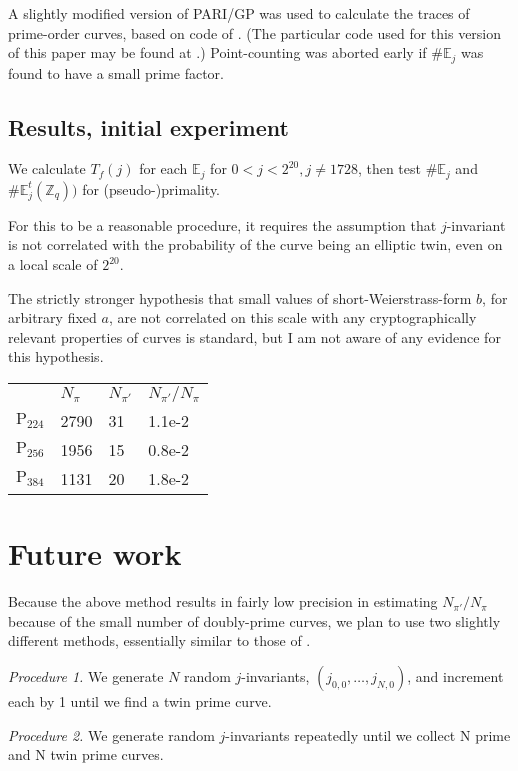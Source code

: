 \documentclass[11pt,fleqn]{article}
\newcommand{\mathup}{\mathrm}
\newcommand{\BbbZ}{\mathbb{Z}}
\newcommand{\BbbE}{\mathbb{E}}
\newcommand{\Ejt}{\ensuremath{\BbbE^t_j(\BbbZ_q))} }
\newcommand{\Tf}{\ensuremath{T_f(j)} }
\newcommand{\Pa}{\ensuremath{\mathup{P}_{224}} }
\newcommand{\Pb}{\ensuremath{\mathup{P}_{256}} }
\newcommand{\Pc}{\ensuremath{\mathup{P}_{384}} }
\newcommand{\Ej}{\ensuremath{\BbbE_j} }
\begin{document}
A slightly modified version of PARI/GP was used to calculate the
traces of prime-order curves, based on code of \autocite{HamburgPARI}.
(The particular code used for this version of this paper may be
found at \autocite{junkpari}.) Point-counting was aborted early
if $\#\Ej$ was found to have a small prime factor.

\subsection{Results, initial experiment} 

We calculate \Tf for each \Ej for $0 < j < 2^{20}, j \neq 1728$, then
test $\#\Ej$ and $\#\Ejt$ for (pseudo-)primality.

For this to be a reasonable procedure, it requires the assumption that
$j$-invariant is not correlated with the probability of the curve being
an elliptic twin, even on a local scale of $2^{20}$.

The strictly stronger hypothesis that small values of short-Weierstrass-form
$b$, for arbitrary fixed $a$, are not correlated on this scale with any
cryptographically relevant properties of curves is standard, but I am not
aware of any evidence for this hypothesis.

\begin{tabular}[l]{l|lll}
      & $N_{\pi}$ & $N_{\pi'}$ & $N_{\pi'} / N_{\pi}$ \\
  \Pa & 2790 & 31 & 1.1e-2 \\
  \Pb & 1956 & 15 & 0.8e-2 \\
  \Pc & 1131 & 20 & 1.8e-2 \\
\end{tabular}

\section{Future work}

Because the above method results in fairly low precision in estimating
$N_{\pi'} / N_{\pi}$ because of the small number of doubly-prime curves,
we plan to use two slightly different methods, essentially similar to those
of \autocite{ShparlinskiSutantyo}.

\emph{Procedure 1.} We generate $N$ random $j$-invariants,
$(j_{0,0}, \ldots, j_{N,0})$, and increment each by 1 until we
find a twin prime curve.

\emph{Procedure 2.} We generate random $j$-invariants repeatedly
until we collect N prime and N twin prime curves.
\end{document}
